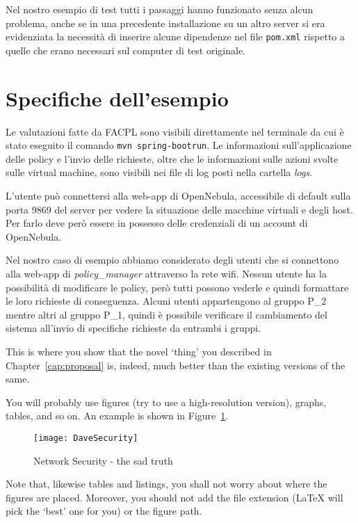 Nel nostro esempio di test tutti i passaggi hanno funzionato senza alcun problema, anche se in una precedente installazione su un altro server si era evidenziata la necessità di inserire alcune dipendenze nel file \texttt{pom.xml} rispetto a quelle che erano necessari sul computer di test originale.

\section{Specifiche dell'esempio}
Le valutazioni fatte da FACPL sono visibili direttamente nel terminale da cui è stato eseguito il comando \texttt{mvn spring-boot\:run}. Le informazioni sull'applicazione delle policy e l'invio delle richieste, oltre che le informazioni sulle azioni svolte sulle virtual machine, sono visibili nei file di log posti nella cartella \emph{logs}.\par
L'utente può connettersi alla web-app di OpenNebula, accessibile di default sulla porta 9869 del server per vedere la situazione delle macchine virtuali e degli host. Per farlo deve però essere in possesso delle credenziali di un account di OpenNebula.\par
Nel nostro caso di esempio abbiamo considerato degli utenti che si connettono alla web-app di \emph{policy\_manager} attraverso la rete wifi. Nessun utente ha la possibilità di modificare le policy, però tutti possono vederle e quindi formattare le loro richieste di conseguenza. Alcuni utenti appartengono al gruppo P\_2 mentre altri al gruppo P\_1, quindi è possibile verificare il cambiamento del sistema all'invio di specifiche richieste da entrambi i gruppi.\par

\par
This is where you show that the novel `thing' you described in Chapter~\ref{cap:proposal} is, indeed, much better than the existing versions of the same.

You will probably use figures (try to use a high-resolution version), graphs, tables, and so on. An example is shown in Figure~\ref{fig:dave}.

\begin{figure}[htbp]
\begin{center}
\texttt{[image: DaveSecurity]}
\caption{Network Security - the sad truth}
\label{fig:dave}
\end{center}
\end{figure}

Note that, likewise tables and listings, you shall not worry about where the figures are placed. Moreover, you should not add the file extension (LaTeX will pick the `best' one for you) or the figure path.
